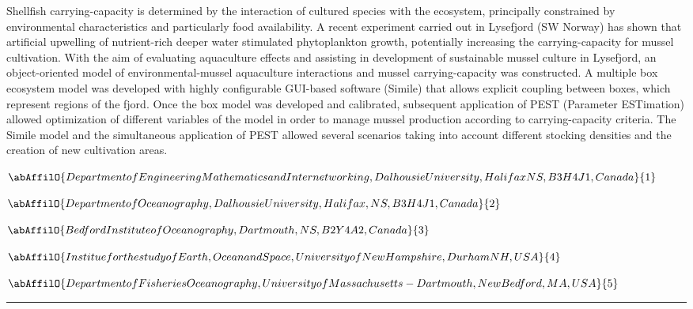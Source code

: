 \noindent Shellfish carrying-capacity is determined by the interaction of cultured species with the ecosystem, principally constrained by environmental characteristics and particularly food availability. A recent experiment carried out in Lysefjord (SW Norway) has shown that artificial upwelling of nutrient-rich deeper water stimulated phytoplankton growth, potentially increasing the carrying-capacity for mussel cultivation. With the aim of evaluating aquaculture effects and assisting in development of sustainable mussel culture in Lysefjord, an object-oriented model of environmental-mussel aquaculture interactions and mussel carrying-capacity was constructed. A multiple box ecosystem model was developed with highly configurable GUI-based software (Simile) that allows explicit coupling between boxes, which represent regions of the fjord. Once the box model was developed and calibrated, subsequent application of PEST (Parameter ESTimation) allowed optimization of different variables of the model in order to manage mussel production according to carrying-capacity criteria. The Simile model and the simultaneous application of PEST allowed several scenarios taking into account different stocking densities and the creation of new cultivation areas.

\begin{center}
   \vspace{2 mm} \begin{center}
    \vspace{2 mm}\begin{center}
  
  $\abAffilO{Department of Engineering Mathematics and Internetworking, Dalhousie University, Halifax NS, B3H 4J1, Canada}{1}$

  
  $\abAffilO{Department of Oceanography, Dalhousie University, Halifax, NS, B3H 4J1, Canada}{2}$

  
  $\abAffilO{Bedford Institute of Oceanography, Dartmouth, NS, B2Y 4A2, Canada}{3}$

  
  $\abAffilO{Institue for the study of Earth, Ocean and Space, University of New Hampshire, Durham NH, USA}{4}$

  
  $\abAffilO{Department of Fisheries Oceanography, University of Massachusetts-Dartmouth, New Bedford, MA, USA}{5}$

  \end{center}
  \vspace{2 mm}
  \end{center}\end{center}
  \begin{center}\rule{0.70\linewidth}{0.5 pt}\end{center}

